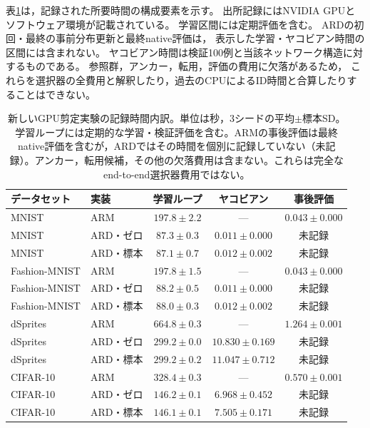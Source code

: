 \documentclass[11pt,a4paper]{ltjsarticle}
\begin{document}
表\ref{tab:newcost}は，記録された所要時間の構成要素を示す。
出所記録にはNVIDIA GPUとソフトウェア環境が記載されている。
学習区間には定期評価を含む。
ARDの初回・最終の事前分布更新と最終native評価は，
表示した学習・ヤコビアン時間の区間には含まれない。
ヤコビアン時間は検証100例と当該ネットワーク構造に対するものである。
参照群，アンカー，転用，評価の費用に欠落があるため，
これらを選択器の全費用と解釈したり，過去のCPUによるID時間と合算したりすることはできない。
\begin{table}[H]
\caption{新しいGPU剪定実験の記録時間内訳。単位は秒，3シードの平均$\pm$標本SD。学習ループには定期的な学習・検証評価を含む。ARMの事後評価は最終native評価を含むが，ARDではその時間を個別に記録していない（未記録）。アンカー，転用候補，その他の欠落費用は含まない。これらは完全なend-to-end選択器費用ではない。}\label{tab:newcost}
\small
\setlength{\tabcolsep}{3pt}
\begin{tabular*}{\textwidth}{@{\extracolsep{\fill}}llccc@{}}
\toprule
データセット & 実装 & 学習ループ & ヤコビアン & 事後評価 \\
\midrule
MNIST & ARM & $197.8 \pm 2.2$ & --- & $0.043 \pm 0.000$ \\
MNIST & ARD・ゼロ & $87.3 \pm 0.3$ & $0.011 \pm 0.000$ & 未記録 \\
MNIST & ARD・標本 & $87.1 \pm 0.7$ & $0.012 \pm 0.002$ & 未記録 \\
Fashion-MNIST & ARM & $197.8 \pm 1.5$ & --- & $0.043 \pm 0.000$ \\
Fashion-MNIST & ARD・ゼロ & $88.2 \pm 0.5$ & $0.011 \pm 0.000$ & 未記録 \\
Fashion-MNIST & ARD・標本 & $88.0 \pm 0.3$ & $0.012 \pm 0.002$ & 未記録 \\
dSprites & ARM & $664.8 \pm 0.3$ & --- & $1.264 \pm 0.001$ \\
dSprites & ARD・ゼロ & $299.2 \pm 0.0$ & $10.830 \pm 0.169$ & 未記録 \\
dSprites & ARD・標本 & $299.2 \pm 0.2$ & $11.047 \pm 0.712$ & 未記録 \\
CIFAR-10 & ARM & $328.4 \pm 0.3$ & --- & $0.570 \pm 0.001$ \\
CIFAR-10 & ARD・ゼロ & $146.2 \pm 0.1$ & $6.968 \pm 0.452$ & 未記録 \\
CIFAR-10 & ARD・標本 & $146.1 \pm 0.1$ & $7.505 \pm 0.171$ & 未記録 \\
\bottomrule\end{tabular*}
\end{table}
\end{document}
